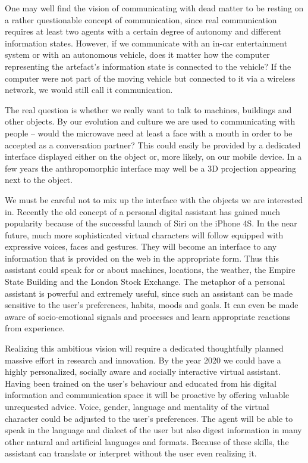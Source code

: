 \begin{multicols}{2}
One may well find the vision of communicating with dead matter to be resting on a rather questionable concept of communication, since real communication requires at least two agents with a certain degree of autonomy and different information states. However, if we communicate with an in-car entertainment system or with an autonomous vehicle, does it matter how the computer representing the artefact’s information state is connected to the vehicle? If the computer were not part of the moving vehicle but connected to it via a wireless network, we would still call it communication.
 
The real question is whether we really want to talk to machines, buildings and other objects. By our evolution and culture we are used to communicating with people – would the microwave need at least a face with a mouth in order to be accepted as a conversation partner? This could easily be provided by a dedicated interface displayed either on the object or, more likely, on our mobile device. In a few years the anthropomorphic interface may well be a 3D projection appearing next to the object.
 
We must be careful not to mix up the interface with the objects we are interested in. Recently the old concept of a personal digital assistant has gained much popularity because of the successful launch of Siri on the iPhone 4S. In the near future, much more sophisticated virtual characters will follow equipped with expressive voices, faces and gestures. They will become an interface to any information that is provided on the web in the appropriate form. Thus this assistant could speak for or about machines, locations, the weather, the Empire State Building and the London Stock Exchange. The metaphor of a personal assistant is powerful and extremely useful, since such an assistant can be made sensitive to the user’s preferences, habits, moods and goals. It can even be made aware of socio-emotional signals and processes and learn appropriate reactions from experience.  
 
Realizing this ambitious vision will require a dedicated thoughtfully planned massive effort in research and innovation. By the year 2020 we could have a highly personalized, socially aware and socially interactive virtual assistant. Having been trained on the user’s behaviour and educated from his digital information and communication space it will be proactive by offering valuable unrequested advice. Voice, gender, language and mentality of the virtual character could be adjusted to the user’s preferences.  The agent will be able to speak in the language and dialect of the user but also digest information in many other natural and artificial languages and formats. Because of these skills, the assistant can translate or interpret without the user even realizing it.
 

\end{multicols}
